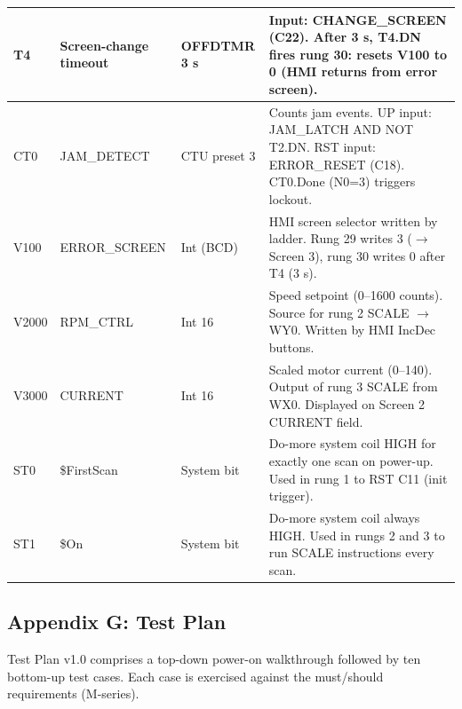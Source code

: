 \documentclass[hidelinks,12pt]{article}
\begin{document}
\begin{xltabular}{\textwidth}{|l|l|l|X|}
T4 & Screen-change timeout & OFFDTMR 3 s & Input: CHANGE\_SCREEN (C22). After 3 s, T4.DN fires rung 30: resets V100 to 0 (HMI returns from error screen). \\ \hline
CT0 & JAM\_DETECT & CTU preset 3 & Counts jam events. UP input: JAM\_LATCH AND NOT T2.DN. RST input: ERROR\_RESET (C18). CT0.Done (N0=3) triggers lockout. \\ \hline
V100 & ERROR\_SCREEN & Int (BCD) & HMI screen selector written by ladder. Rung 29 writes 3 ($\rightarrow$ Screen 3), rung 30 writes 0 after T4 (3 s). \\ \hline
V2000 & RPM\_CTRL & Int 16 & Speed setpoint (0--1600 counts). Source for rung 2 SCALE $\rightarrow$ WY0. Written by HMI IncDec buttons. \\ \hline
V3000 & CURRENT & Int 16 & Scaled motor current (0--140). Output of rung 3 SCALE from WX0. Displayed on Screen 2 CURRENT field. \\ \hline
ST0 & \$FirstScan & System bit & Do-more system coil HIGH for exactly one scan on power-up. Used in rung 1 to RST C11 (init trigger). \\ \hline
ST1 & \$On & System bit & Do-more system coil always HIGH. Used in rungs 2 and 3 to run SCALE instructions every scan. \\ \hline
\end{xltabular}
\renewcommand{\arraystretch}{1.0}

\subsection{Appendix G: Test Plan}
Test Plan v1.0 comprises a top-down power-on walkthrough followed by ten bottom-up
test cases. Each case is exercised against the must/should requirements (M-series).
\end{document}
